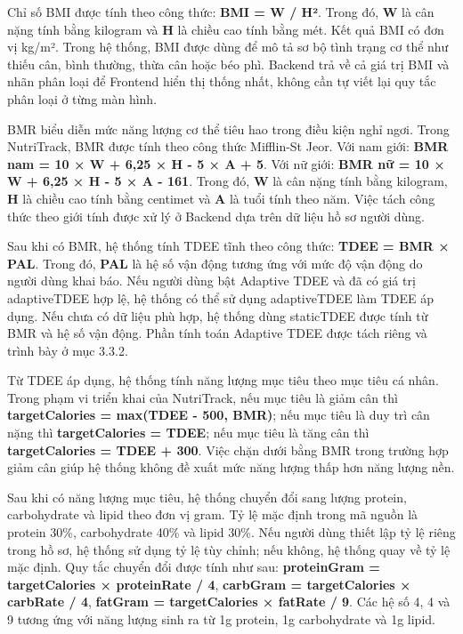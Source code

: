 \documentclass[12pt, a4paper]{report}
\begin{document}
Chỉ số BMI được tính theo công thức: \textbf{BMI = W / H²}. Trong đó, \textbf{W} là cân nặng tính bằng kilogram và \textbf{H} là chiều cao tính bằng mét. Kết quả BMI có đơn vị kg/m². Trong hệ thống, BMI được dùng để mô tả sơ bộ tình trạng cơ thể như thiếu cân, bình thường, thừa cân hoặc béo phì. Backend trả về cả giá trị BMI và nhãn phân loại để Frontend hiển thị thống nhất, không cần tự viết lại quy tắc phân loại ở từng màn hình.

BMR biểu diễn mức năng lượng cơ thể tiêu hao trong điều kiện nghỉ ngơi. Trong NutriTrack, BMR được tính theo công thức Mifflin-St Jeor. Với nam giới: \textbf{BMR nam = 10 × W + 6,25 × H - 5 × A + 5}. Với nữ giới: \textbf{BMR nữ = 10 × W + 6,25 × H - 5 × A - 161}. Trong đó, \textbf{W} là cân nặng tính bằng kilogram, \textbf{H} là chiều cao tính bằng centimet và \textbf{A} là tuổi tính theo năm. Việc tách công thức theo giới tính được xử lý ở Backend dựa trên dữ liệu hồ sơ người dùng.

Sau khi có BMR, hệ thống tính TDEE tĩnh theo công thức: \textbf{TDEE = BMR × PAL}. Trong đó, \textbf{PAL} là hệ số vận động tương ứng với mức độ vận động do người dùng khai báo. Nếu người dùng bật Adaptive TDEE và đã có giá trị adaptiveTDEE hợp lệ, hệ thống có thể sử dụng adaptiveTDEE làm TDEE áp dụng. Nếu chưa có dữ liệu phù hợp, hệ thống dùng staticTDEE được tính từ BMR và hệ số vận động. Phần tính toán Adaptive TDEE được tách riêng và trình bày ở mục 3.3.2.

Từ TDEE áp dụng, hệ thống tính năng lượng mục tiêu theo mục tiêu cá nhân. Trong phạm vi triển khai của NutriTrack, nếu mục tiêu là giảm cân thì \textbf{targetCalories = max(TDEE - 500, BMR)}; nếu mục tiêu là duy trì cân nặng thì \textbf{targetCalories = TDEE}; nếu mục tiêu là tăng cân thì \textbf{targetCalories = TDEE + 300}. Việc chặn dưới bằng BMR trong trường hợp giảm cân giúp hệ thống không đề xuất mức năng lượng thấp hơn năng lượng nền.

Sau khi có năng lượng mục tiêu, hệ thống chuyển đổi sang lượng protein, carbohydrate và lipid theo đơn vị gram. Tỷ lệ mặc định trong mã nguồn là protein 30\%, carbohydrate 40\% và lipid 30\%. Nếu người dùng thiết lập tỷ lệ riêng trong hồ sơ, hệ thống sử dụng tỷ lệ tùy chỉnh; nếu không, hệ thống quay về tỷ lệ mặc định. Quy tắc chuyển đổi được tính như sau: \textbf{proteinGram = targetCalories × proteinRate / 4}, \textbf{carbGram = targetCalories × carbRate / 4}, \textbf{fatGram = targetCalories × fatRate / 9}. Các hệ số 4, 4 và 9 tương ứng với năng lượng sinh ra từ 1g protein, 1g carbohydrate và 1g lipid.
\end{document}
